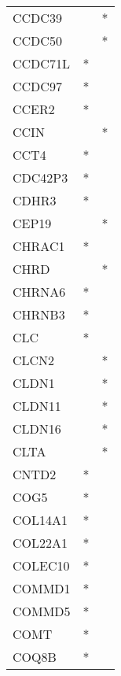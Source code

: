 \begin{longtable}{lcc}
CCDC39           &                &          * \\
CCDC50           &                &          * \\
CCDC71L          &              * &            \\
CCDC97           &              * &            \\
CCER2            &              * &            \\
CCIN             &                &          * \\
CCT4             &              * &            \\
CDC42P3          &              * &            \\
CDHR3            &              * &            \\
CEP19            &                &          * \\
CHRAC1           &              * &            \\
CHRD             &                &          * \\
CHRNA6           &              * &            \\
CHRNB3           &              * &            \\
CLC              &              * &            \\
CLCN2            &                &          * \\
CLDN1            &                &          * \\
CLDN11           &                &          * \\
CLDN16           &                &          * \\
CLTA             &                &          * \\
CNTD2            &              * &            \\
COG5             &              * &            \\
COL14A1          &              * &            \\
COL22A1          &              * &            \\
COLEC10          &              * &            \\
COMMD1           &              * &            \\
COMMD5           &              * &            \\
COMT             &              * &            \\
COQ8B            &              * &            \\

\end{longtable}
